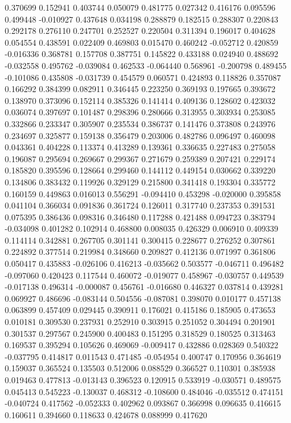 0.370699
0.152941
0.403744
0.050079
0.481775
0.027342
0.416176
0.095596
0.499448
-0.010927
0.437648
0.034198
0.288879
0.182515
0.288307
0.220843
0.292178
0.276110
0.247701
0.252527
0.220504
0.311394
0.196017
0.404628
0.054554
0.438591
0.022409
0.469803
0.015470
0.460242
-0.052712
0.420859
-0.016336
0.368781
0.157708
0.387751
0.145822
0.433188
0.024940
0.488692
-0.032558
0.495762
-0.039084
0.462533
-0.064440
0.568961
-0.200798
0.489455
-0.101086
0.435808
-0.031739
0.454579
0.060571
0.424893
0.118826
0.357087
0.166292
0.384399
0.082911
0.346445
0.223250
0.369193
0.197665
0.393672
0.138970
0.373096
0.152114
0.385326
0.141414
0.409136
0.128602
0.423032
0.036074
0.397697
0.101487
0.298396
0.280666
0.313955
0.303934
0.253085
0.332866
0.233347
0.305907
0.235534
0.386737
0.141476
0.373808
0.243976
0.234697
0.325877
0.159138
0.356479
0.203006
0.482786
0.096497
0.460098
0.043361
0.404228
0.113374
0.413289
0.139361
0.336635
0.227483
0.275058
0.196087
0.295694
0.269667
0.299367
0.271679
0.259389
0.207421
0.229174
0.185820
0.395596
0.128664
0.299460
0.144112
0.449154
0.030662
0.339220
0.134806
0.383432
0.119926
0.329129
0.215800
0.341418
0.193304
0.335772
0.160159
0.449863
0.016013
0.556291
-0.094410
0.453298
-0.020000
0.395858
0.041104
0.366034
0.091836
0.361724
0.126011
0.317740
0.237353
0.391531
0.075395
0.386436
0.098316
0.346480
0.117288
0.421488
0.094723
0.383794
-0.034098
0.401282
0.102914
0.468800
0.008035
0.426329
0.006910
0.409339
0.114114
0.342881
0.267705
0.301141
0.300415
0.228677
0.276252
0.307861
0.224892
0.377514
0.219984
0.348660
0.209827
0.412136
0.071997
0.361806
0.050417
0.435883
-0.026106
0.416213
-0.035662
0.503577
-0.046711
0.496482
-0.097060
0.420423
0.117544
0.460072
-0.019077
0.458967
-0.030757
0.449539
-0.017138
0.496314
-0.000087
0.456761
-0.016680
0.446327
0.037814
0.439281
0.069927
0.486696
-0.083144
0.504556
-0.087081
0.398070
0.010177
0.457138
0.063899
0.457409
0.029445
0.390911
0.176021
0.415186
0.185905
0.473653
0.010181
0.309530
0.237931
0.252910
0.303915
0.251052
0.304494
0.201901
0.301537
0.297567
0.245900
0.400483
0.151295
0.318529
0.180525
0.313463
0.169537
0.395294
0.105626
0.469069
-0.009417
0.432886
0.028369
0.540322
-0.037795
0.414817
0.011543
0.471485
-0.054954
0.400747
0.170956
0.364619
0.159037
0.365524
0.135503
0.512006
0.088529
0.366527
0.110301
0.385938
0.019463
0.477813
-0.013143
0.396523
0.120915
0.533919
-0.030571
0.489575
0.045413
0.545223
-0.130037
0.468312
-0.108600
0.484046
-0.035512
0.474151
-0.040724
0.417562
-0.052333
0.402962
0.093867
0.366998
0.096635
0.416615
0.160611
0.394660
0.118633
0.424678
0.088999
0.417620
